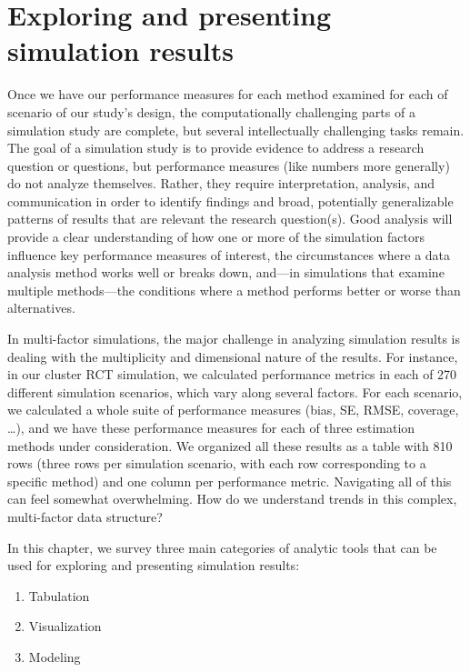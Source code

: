 \documentclass[
]{book}
\providecommand{\tightlist}{%
  \setlength{\itemsep}{0pt}\setlength{\parskip}{0pt}}
\begin{document}
\chapter{Exploring and presenting simulation results}\label{presentation-of-results}

Once we have our performance measures for each method examined for each of scenario of our study's design, the computationally challenging parts of a simulation study are complete, but several intellectually challenging tasks remain.
The goal of a simulation study is to provide evidence to address a research question or questions, but
performance measures (like numbers more generally) do not analyze themselves.
Rather, they require interpretation, analysis, and communication in order to identify findings and broad, potentially generalizable patterns of results that are relevant the research question(s).
Good analysis will provide a clear understanding of how one or more of the simulation factors influence key performance measures of interest, the circumstances where a data analysis method works well or breaks down, and---in simulations that examine multiple methods---the conditions where a method performs better or worse than alternatives.

In multi-factor simulations, the major challenge in analyzing simulation results is dealing with the multiplicity and dimensional nature of the results.
For instance, in our cluster RCT simulation, we calculated performance metrics in each of 270 different simulation scenarios, which vary along several factors.
For each scenario, we calculated a whole suite of performance measures (bias, SE, RMSE, coverage, \ldots), and we have these performance measures for each of three estimation methods under consideration.
We organized all these results as a table with 810 rows (three rows per simulation scenario, with each row corresponding to a specific method) and one column per performance metric.
Navigating all of this can feel somewhat overwhelming.
How do we understand trends in this complex, multi-factor data structure?

In this chapter, we survey three main categories of analytic tools that can be used for exploring and presenting simulation results:

\begin{enumerate}
\def\labelenumi{\arabic{enumi}.}
\tightlist
\item
  Tabulation
\item
  Visualization
\item
  Modeling
\end{enumerate}
\end{document}
